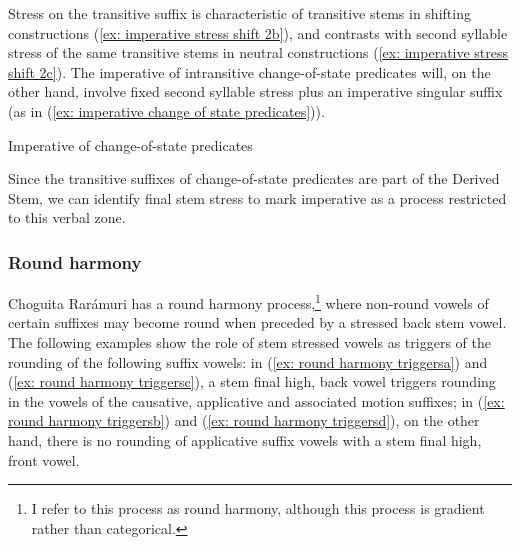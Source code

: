 Stress on the transitive suffix is characteristic of transitive stems in shifting constructions (\ref{ex: imperative stress shift 2b}), and contrasts with second syllable stress of the same transitive stems in neutral constructions (\ref{ex: imperative stress shift 2c}). The imperative of intransitive change-of-state predicates will, on the other hand, involve fixed second syllable stress plus an imperative singular suffix (as in (\ref{ex: imperative change of state predicates})).

\ea\label{ex: imperative change of state predicates}
{Imperative of change-of-state predicates}

    \z
\z

Since the transitive suffixes of change-of-state predicates are part of the Derived Stem, we can identify final stem stress to mark imperative as a process restricted to this verbal zone.

\largerpage[2]
\subsubsection{Round harmony}
\label{subsubsec: round harmony}

Choguita Rarámuri has a round harmony process,\footnote{I refer to this process as round harmony, although this process is gradient rather than categorical.} where non-round vowels of certain suffixes may become round when preceded by a stressed back stem vowel. The following examples show the role of stem stressed vowels as triggers of the rounding of the following suffix vowels: in (\ref{ex: round  harmony triggersa}) and (\ref{ex: round  harmony triggersc}), a stem final high, back vowel triggers rounding in the vowels of the causative, applicative and associated motion suffixes; in (\ref{ex: round  harmony triggersb}) and (\ref{ex: round  harmony triggersd}), on the other hand, there is no rounding of applicative suffix vowels with a stem final high, front vowel.


